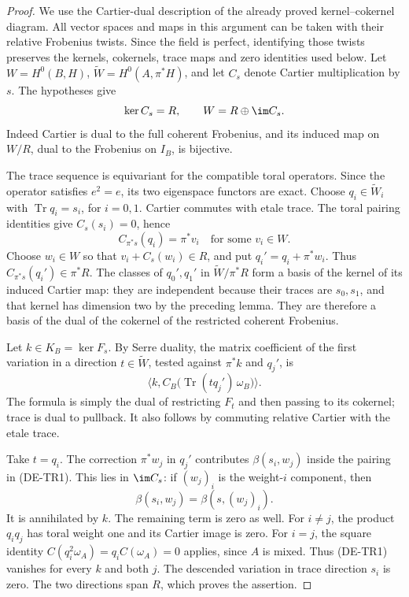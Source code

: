 \begin{proof}
We use the Cartier-dual description of the already proved
kernel--cokernel diagram. All vector spaces and maps in this
argument can be taken with their relative Frobenius twists.
Since the field is perfect, identifying those twists preserves
the kernels, cokernels, trace maps and zero identities used below.
Let $W=H^0(B,H)$, $\widetilde W=H^0(A,\pi^*H)$, and let
$C_s$ denote Cartier multiplication by $s$. The hypotheses give
\[
 \ker C_s=R,\qquad W=R\oplus\im C_s.
\]
Indeed Cartier is dual to the full coherent Frobenius, and its
induced map on $W/R$, dual to the Frobenius on $I_B$, is bijective.

The trace sequence is equivariant for the compatible toral
operators. Since the operator satisfies $e^2=e$, its two
eigenspace functors are exact. Choose $q_i\in\widetilde W_i$
with $\operatorname{Tr}q_i=s_i$, for $i=0,1$.
Cartier commutes with etale trace. The toral pairing identities
give $C_s(s_i)=0$, hence
\[
             C_{\pi^*s}(q_i)=\pi^*v_i
                 \quad\text{for some }v_i\in W.
\]
Choose $w_i\in W$ so that
$v_i+C_s(w_i)\in R$, and put $q_i'=q_i+\pi^*w_i$.
Thus $C_{\pi^*s}(q_i')\in\pi^*R$.
The classes of $q_0',q_1'$ in
$\widetilde W/\pi^*R$ form a basis of the kernel of its induced
Cartier map: they are independent because their traces are
$s_0,s_1$, and that kernel has dimension two by the preceding
lemma. They are therefore a basis of the dual of the cokernel
of the restricted coherent Frobenius.

Let $k\in K_B=\ker F_s$. By Serre duality, the matrix coefficient
of the first variation in a direction $t\in\widetilde W$,
tested against $\pi^*k$ and $q_j'$, is
\[
       \bigl\langle k,
          C_B\bigl(\operatorname{Tr}(tq_j')\,\omega_B\bigr)
       \bigr\rangle.
                                                        \tag{DE-TR1}
\]
The formula is simply the dual of restricting $F_t$ and then
passing to its cokernel; trace is dual to pullback. It also
follows by commuting relative Cartier with the etale trace.

Take $t=q_i$. The correction $\pi^*w_j$ in $q_j'$ contributes
$\beta(s_i,w_j)$ inside the pairing in (DE-TR1). This lies in
$\im C_s$: if $(w_j)_i$ is the weight-$i$ component, then
\[
                \beta(s_i,w_j)=\beta(s,(w_j)_i).
\]
It is annihilated by $k$. The remaining term is zero as well.
For $i\ne j$, the product $q_iq_j$ has toral weight one and
its Cartier image is zero. For $i=j$, the square identity
$C(q_i^2\omega_A)=q_iC(\omega_A)=0$ applies, since $A$ is mixed.
Thus (DE-TR1) vanishes for every $k$ and both $j$.
The descended variation in trace direction $s_i$ is zero.
The two directions span $R$, which proves the assertion.
\end{proof}

